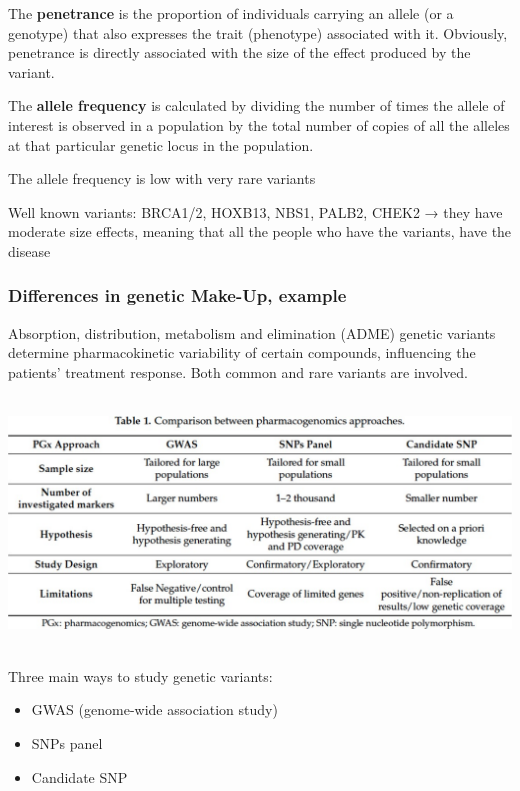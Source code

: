 The \textbf{penetrance} is the proportion of individuals carrying an allele (or
a genotype) that also expresses the trait (phenotype) associated with it.
Obviously, penetrance is directly associated with the size of the effect
produced by the variant.

The \textbf{allele frequency} is calculated by dividing the number of times the
allele of interest is observed in a population by the total number of copies of
all the alleles at that particular genetic locus in the population.

The allele frequency is low with very rare variants

Well known variants: BRCA1/2, HOXB13, NBS1, PALB2, CHEK2 → they have moderate
size effects, meaning that all the people who have the variants, have the
disease


\hypertarget{differences-in-genetic-make-up-example}{%
\subsubsection{Differences in genetic Make-Up,
example}\label{differences-in-genetic-make-up-example}}


Absorption, distribution, metabolism and elimination (ADME) genetic variants
determine pharmacokinetic variability of certain compounds, influencing the
patients' treatment response. Both common and rare variants are involved.

\includegraphics[width=6.18852in,height=2.6224in]{image5.jpeg}

Three main ways to study genetic variants: 

\begin{itemize}
  \item GWAS (genome-wide association study)
  \item SNPs panel
  \item Candidate SNP
\end{itemize}




